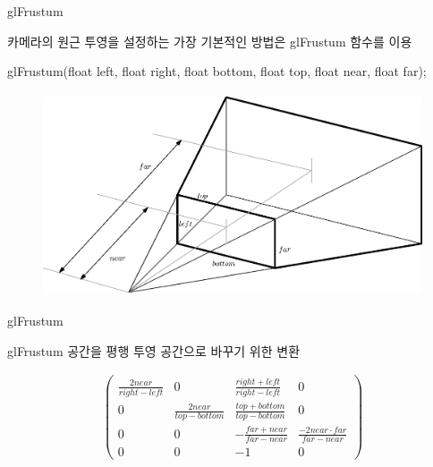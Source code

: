 \documentclass{beamer}
\begin{document}
\begin{frame}[fragile]{glFrustum}

{\small 
카메라의 원근 투영을 설정하는 가장 기본적인 방법은 {\sf glFrustum} 함수를 이용

glFrustum(float left, float right, float bottom, float top, float near, float far);
}

\begin{figure}[h!]
  \centering
    \includegraphics[height=6cm]{OGL_camera/glFrustum.eps}
\end{figure}
\end{frame}

\begin{frame}[fragile]{glFrustum}

glFrustum 공간을 평행 투영 공간으로 바꾸기 위한 변환

\begin{eqnarray}
\label{eq:OGL_camera:glFrustumMatrix}
\left ( 
\begin{array}{cccc} \nonumber
\frac{2 near}{right-left}& 0 & \frac{right+left}{right - left} & 0\\ \nonumber
0& \frac{2 near}{top-bottom} & \frac{top+bottom}{top - bottom} & 0\\ \nonumber
0& 0 & -\frac{far+near}{far-near} & \frac{-2 near \cdot far}{far-near}\\ \nonumber
0& 0 & -1 & 0 \nonumber
\end{array} 
\right )
\end{eqnarray}

\end{frame}
\end{document}
